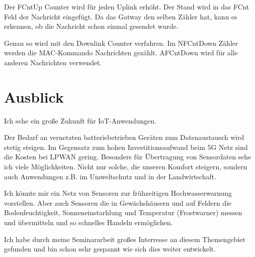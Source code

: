 \documentclass[a4paper, 12pt]{article}
\begin{document}
            Der FCntUp Counter wird für jeden Uplink erhöht. Der Stand wird in das FCnt Feld der 
            Nachricht eingefügt. Da das Gatway den selben Zähler hat, kann es erkennen, ob die Nachricht schon einmal 
            gesendet wurde.

            Genau so wird mit den Downlink Counter verfahren. Im NFCntDown Zähler werden die 
            MAC-Kommando Nachrichten gezählt. AFCntDown wird für alle anderen Nachrichten verwendet.
            \cite[S.22 ff]{LoRaSecur}

    \section{Ausblick}
        Ich sehe ein große Zukunft für IoT-Anwendungen.
        
        Der Bedarf an vernetzten batteriebetrieben Geräten zum Datenaustausch wird stetig steigen. Im Gegensatz zum hohen
        Investitionsaufwand beim 5G Netz sind die Kosten bei LPWAN gering. Besonders für Übertragung von Sensordaten 
        sehe ich viele Möglichkeiten. Nicht nur solche, die unseren Komfort steigern, sondern auch 
        Anwendungen z.B. im Umweltschutz und in der Landwirtschaft.

        Ich könnte mir ein Netz von Sensoren zur frühzeitigen Hochwasserwarnung vorstellen. Aber auch Sensoren 
        die in Gewächshäusern und auf Feldern die Bodenfeuchtigkeit, Sonneneinstarhlung und Temperatur (Frostwarner) messen
        und übermitteln und so schnelles Handeln ermöglichen.

        Ich habe durch meine Seminararbeit großes Interresse an diesem Themengebiet gefunden und bin schon 
        sehr gespannt wie sich dies weiter entwickelt.


      

    \newpage
    
    
\end{document}
